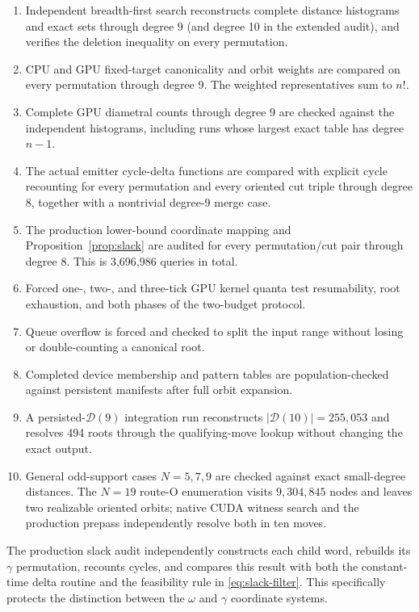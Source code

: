 \documentclass[11pt]{article}
\theoremstyle{definition}
\theoremstyle{remark}
\newcommand{\D}{\mathcal D}
\begin{document}
\begin{enumerate}
  \item Independent breadth-first search reconstructs complete distance
    histograms and exact sets through degree 9 (and degree 10 in the extended
    audit), and verifies the deletion inequality on every permutation.
  \item CPU and GPU fixed-target canonicality and orbit weights are compared
    on every permutation through degree 9.  The weighted representatives sum
    to $n!$.
  \item Complete GPU diametral counts through degree 9 are checked against the
    independent histograms, including runs whose largest exact table has
    degree $n-1$.
  \item The actual emitter cycle-delta functions are compared with explicit
    cycle recounting for every permutation and every oriented cut triple
    through degree 8, together with a nontrivial degree-9 merge case.
  \item The production lower-bound coordinate mapping and
    Proposition~\ref{prop:slack} are audited for every permutation/cut pair
    through degree 8.  This is 3,696,986 queries in total.
  \item Forced one-, two-, and three-tick GPU kernel quanta test resumability,
    root exhaustion, and both phases of the two-budget protocol.
  \item Queue overflow is forced and checked to split the input range without
    losing or double-counting a canonical root.
  \item Completed device membership and pattern tables are population-checked
    against persistent manifests after full orbit expansion.
  \item A persisted-$\D(9)$ integration run reconstructs
    $|\D(10)|=255{,}053$ and resolves 494 roots through the qualifying-move
    lookup without changing the exact output.
  \item General odd-support cases $N=5,7,9$ are checked against exact
    small-degree distances.  The $N=19$ route-O enumeration visits
    $9{,}304{,}845$ nodes and leaves two realizable oriented orbits; native
    CUDA witness search and the production prepass independently resolve both
    in ten moves.
\end{enumerate}

The production slack audit independently constructs each child word, rebuilds
its $\gamma$ permutation, recounts cycles, and compares this result with both
the constant-time delta routine and the feasibility rule in \eqref{eq:slack-filter}.
This specifically protects the distinction between the $\omega$ and
$\gamma$ coordinate systems.
\end{document}

